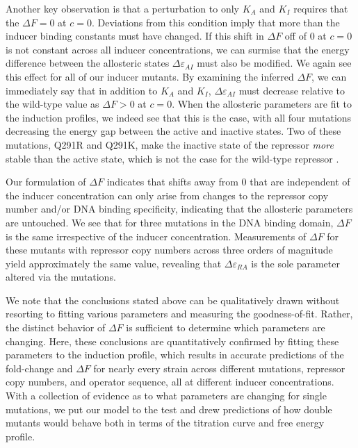 Another key observation is that a perturbation to only $K_A$ and $K_I$ requires
that the $\Delta F = 0$ at $c = 0$. Deviations from this condition imply that more than
the inducer binding constants must have changed. If this shift in $\Delta F$ off of $0$ at
$c = 0$ is not constant across all inducer concentrations, we can surmise
that the energy difference between the allosteric states
$\Delta\varepsilon_{AI}$ must also be modified. We again see this effect for all
of our inducer mutants. By examining the inferred $\Delta F$, we can
immediately say that in addition to $K_A$ and $K_I$, $\Delta\varepsilon_{AI}$
must decrease relative to the wild-type value as $\Delta F > 0$ at $c = 0$.
When the allosteric parameters are fit to the induction profiles, we indeed
see that this is the case, with all four mutations decreasing the energy gap
between the active and inactive states. Two of these mutations, Q291R and
Q291K, make the inactive state of the repressor \textit{more} stable than the
active state, which is not the case for the wild-type
repressor \cite{Razo-Mejia2018}.

Our formulation of $\Delta F$ indicates that shifts away from $0$ that are
independent of the inducer concentration can only arise from changes to the
repressor copy number and/or DNA binding specificity, indicating that the
allosteric parameters are untouched. We see that for three mutations in the
DNA binding domain, $\Delta F$ is the same irrespective of the inducer
concentration. Measurements of $\Delta F$ for these mutants with repressor
copy numbers across three orders of magnitude yield approximately the same
value, revealing that $\Delta\varepsilon_{RA}$ is the sole parameter altered
via the mutations.

We note that the conclusions stated above can be qualitatively drawn without
resorting to fitting various parameters and measuring the goodness-of-fit.
Rather, the distinct behavior of $\Delta F$ is sufficient to determine which
parameters are changing. Here, these conclusions are quantitatively confirmed by
fitting these parameters to the induction profile, which results in accurate
predictions of the fold-change and $\Delta F$ for nearly every strain across 
different mutations, repressor copy numbers, and operator sequence, all at
different inducer concentrations. With a collection of evidence as to what
parameters are changing for single mutations, we put our model to the test
and drew predictions of how double mutants would behave both in terms of the
titration curve and free energy profile.


